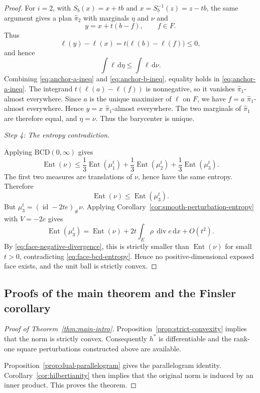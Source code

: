 \documentclass[10pt,a4paper]{amsart}
\numberwithin{equation}{section}
\newcommand{\Ent}{\operatorname{Ent}}
\newcommand{\id}{\operatorname{id}}
\newcommand{\diver}{\operatorname{div}}
\newcommand{\dd}{\mathrm d}
\begin{document}
\begin{proof}
		For $i=2$, with $S_b(x)=x+tb$ and $x=S_b^{-1}(z)=z-tb$, the same argument gives a plan $\widehat\pi_2$ with marginals $\eta$ and $\nu$ and
		\[
		y=x+t(b-f),
		\qquad f\in F.
		\]
		Thus
		\[
		\ell(y)-\ell(x)=t\bigl(\ell(b)-\ell(f)\bigr)\le0,
		\]
		and hence
		\begin{equation}\label{eq:anchor-b-ineq}
			\int \ell\,\dd\eta\le\int \ell\,\dd\nu.
		\end{equation}
		Combining \eqref{eq:anchor-a-ineq} and \eqref{eq:anchor-b-ineq}, equality holds in \eqref{eq:anchor-a-ineq}. The integrand $t(\ell(a)-\ell(f))$ is nonnegative, so it vanishes \(\widehat\pi_1\)-almost everywhere. Since $a$ is the unique maximizer of $\ell$ on $F$, we have $f=a$ \(\widehat\pi_1\)-almost everywhere. Hence $y=x$ \(\widehat\pi_1\)-almost everywhere. The two marginals of $\widehat\pi_1$ are therefore equal, and $\eta=\nu$.
		Thus the barycenter is unique.
		
		
		\medskip
		\noindent\emph{Step 4: The entropy contradiction.}
		
		 Applying $\mathrm{BCD}(0,\infty)$ gives
		\[
		\Ent(\nu)
		\le\frac13\Ent(\mu_1^t)+\frac13\Ent(\mu_2^t)+\frac13\Ent(\mu_3^t).
		\]
		The first two measures are translations of $\nu$, hence have the same entropy. Therefore
		\begin{equation}\label{eq:face-bcd-entropy}
			\Ent(\nu)\le \Ent(\mu_3^t).
		\end{equation}
		But $\mu_3^t=(\id-2t e)_\#\nu$. Applying Corollary~\ref{cor:smooth-perturbation-entropy} with $V=-2e$ gives
		\[
		\Ent(\mu_3^t)
		=\Ent(\nu)+2t\int_E\rho\,\diver e\,\dd x+O(t^2).
		\]
		By \eqref{eq:face-negative-divergence}, this is strictly smaller than $\Ent(\nu)$ for small $t>0$, contradicting \eqref{eq:face-bcd-entropy}. Hence no positive-dimensional exposed face exists, and the unit ball is strictly convex.
	\end{proof}
	
	\subsection*{Proofs of the main theorem and the Finsler corollary}\label{sec:main-corollary-proofs}
	

	\begin{proof}[Proof of Theorem~\ref{thm:main-intro}]
		Proposition~\ref{prop:strict-convexity} implies that the norm is strictly convex. Consequently \(h^*\) is differentiable and the rank-one
		square perturbations constructed above are available.
		
		Proposition~\ref{prop:dual-parallelogram} gives the
		parallelogram identity. Corollary~\ref{cor:hilbertianity} then implies that the original
		norm is induced by an inner product. This proves the theorem.
	\end{proof}
	
\end{document}
